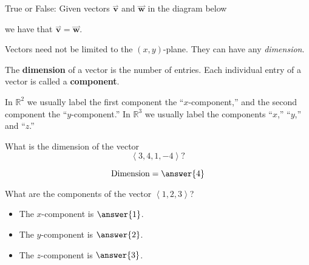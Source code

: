 \documentclass{ximera}
\renewcommand{\vec}[1]{{\overset{\boldsymbol{\rightharpoonup}}{\mathbf{#1}}}}
\renewcommand{\vector}[1]{\left\langle #1\right\rangle}
\begin{document}
\begin{question}
  True or False: Given vectors $\vec{v}$ and $\vec{w}$ in the diagram
  below
  \begin{image}
\end{image}
  we have that $\vec{v}=\vec{w}$.
  \begin{prompt}
  \begin{multipleChoice}
  \end{multipleChoice}
  \end{prompt}
\end{question}

Vectors need not be limited to the $(x,y)$-plane. They can have any \textit{dimension}.

\begin{definition}
The \textbf{dimension} of a vector is the number of entries. Each
individual entry of a vector is called a \textbf{component}.
\end{definition}

In $\mathbb{R}^2$ we usually label the first component the ``$x$-component,''
and the second component the ``$y$-component.'' In $\mathbb{R}^3$ we usually
label the components ``$x$,'' ``$y$,'' and ``$z$.''


\begin{question}
  What is the dimension of the vector 
  \[
  \vector{3,4,1,-4}?
  \]
  \begin{prompt}
  \[
  \text{Dimension} = \answer{4}
  \]
  \end{prompt}
  \begin{question}
    What are the components of the vector $\vector{1,2,3}$?
    \begin{prompt}
      \begin{itemize}
      \item The $x$-component is $\answer{1}$.
      \item The $y$-component is $\answer{2}$.
      \item The $z$-component is $\answer{3}$.
      \end{itemize}
    \end{prompt}
  \end{question}
\end{question}
\end{document}
